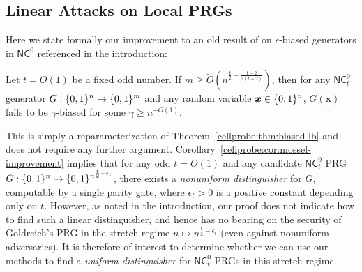 \subsection{Linear Attacks on Local PRGs}
Here we state formally our improvement to an old result of \cite{mossel-epsilon} on $\epsilon$-biased generators in $\mathsf{NC}^0$ referenced in the introduction:
\begin{corollary*}
Let $t = O(1)$ be a fixed odd number. If $m \geq \tilde{O}( n^{\frac{t}{2} - \frac{t-2}{2(t+2)}})$, then for any $\mathsf{NC}^0_t$ generator $G: \{0,1\}^n \to \{0,1\}^m$ and any random variable $\bm{x} \in \{0,1\}^n$, $G(\bm{x})$ fails to be $\gamma$-biased for some $\gamma \geq n^{-O(1)}$.
\end{corollary*}
This is simply a reparameterization of Theorem~\ref{cellprobe:thm:biased-lb} and does not require any further argument. Corollary~\ref{cellprobe:cor:mossel-improvement} implies that for any odd $t=O(1)$ and any candidate $\mathsf{NC}_t^0$ PRG $G: \{0,1\}^n \to \{0,1\}^{n^{\frac{t}{2}- \epsilon_t}}$, there exists a \emph{nonuniform distinguisher} for $G$, computable by a single parity gate, where $\epsilon_t > 0$ is a positive constant depending only on $t$. However, as noted in the introduction, our proof does not indicate how to find such a linear distinguisher, and hence has no bearing on the security of Goldreich's PRG in the stretch regime $n \mapsto n^{\frac{t}{2}- \epsilon_t}$ (even against nonuniform adversaries). It is therefore of interest to determine whether we can use our methods to find a \emph{uniform distinguisher} for $\mathsf{NC}^0_t$ PRGs in this stretch regime. 

